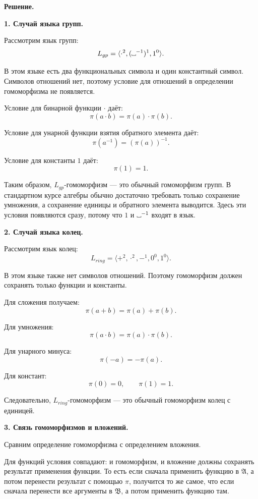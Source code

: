 \documentclass[12pt,a4paper,oneside,openany]{book}
\theoremstyle{definition}
\theoremstyle{plain}
\theoremstyle{remark}
\newcommand{\blank}[1][1.2ex]{%
  \mbox{%
    \vrule width 0.1ex height 0.4ex depth 0pt %
    \vrule width #1 height 0.1ex depth 0pt    %
    \vrule width 0.1ex height 0.4ex depth 0pt %
  }%
}
\begin{document}
\par\medskip
\textbf{Решение.}
\par\smallskip

\textbf{1. Случай языка групп.}

Рассмотрим язык групп:
\[
L_{gp}=\langle \cdot^2,(\blank^{-1})^1,1^0\rangle.
\]

В этом языке есть два функциональных символа и один константный символ. Символов отношений нет, поэтому условие для отношений в определении гомоморфизма не появляется.

Условие для бинарной функции $\cdot$ даёт:
\[
\pi(a\cdot b)=\pi(a)\cdot\pi(b).
\]

Условие для унарной функции взятия обратного элемента даёт:
\[
\pi(a^{-1})=(\pi(a))^{-1}.
\]

Условие для константы $1$ даёт:
\[
\pi(1)=1.
\]

Таким образом, $L_{gp}$-гомоморфизм — это обычный гомоморфизм групп. В стандартном курсе алгебры обычно достаточно требовать только сохранение умножения, а сохранение единицы и обратного элемента выводится. Здесь эти условия появляются сразу, потому что $1$ и $\blank^{-1}$ входят в язык.

\textbf{2. Случай языка колец.}

Рассмотрим язык колец:
\[
L_{ring}=\langle +^2,\cdot^2,-^1,0^0,1^0\rangle.
\]

В этом языке также нет символов отношений. Поэтому гомоморфизм должен сохранять только функции и константы.

Для сложения получаем:
\[
\pi(a+b)=\pi(a)+\pi(b).
\]

Для умножения:
\[
\pi(a\cdot b)=\pi(a)\cdot\pi(b).
\]

Для унарного минуса:
\[
\pi(-a)=-\pi(a).
\]

Для констант:
\[
\pi(0)=0,
\qquad
\pi(1)=1.
\]

Следовательно, $L_{ring}$-гомоморфизм — это обычный гомоморфизм колец с единицей.

\textbf{3. Связь гомоморфизмов и вложений.}

Сравним определение гомоморфизма с определением вложения.

Для функций условия совпадают: и гомоморфизм, и вложение должны сохранять результат применения функции. То есть если сначала применить функцию в $\mathfrak A$, а потом перенести результат с помощью $\pi$, получится то же самое, что если сначала перенести все аргументы в $\mathfrak B$, а потом применить функцию там.
\end{document}
